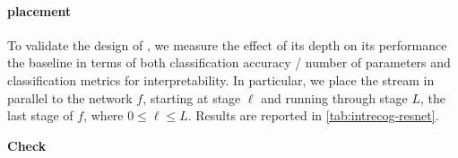
\paragraph{\Ours placement}
\label{ab:placement}

To validate the design of \Ours, we measure the effect of its depth on its performance \vs the baseline \gap in terms of both classification accuracy / number of parameters and classification metrics for interpretability. In particular, we place the stream in parallel to the network $f$, starting at stage $\ell$ and running through stage $L$, the last stage of $f$, where $0 \le \ell \le L$. Results are reported in \autoref{tab:intrecog-resnet}.

\textbf{Check}

